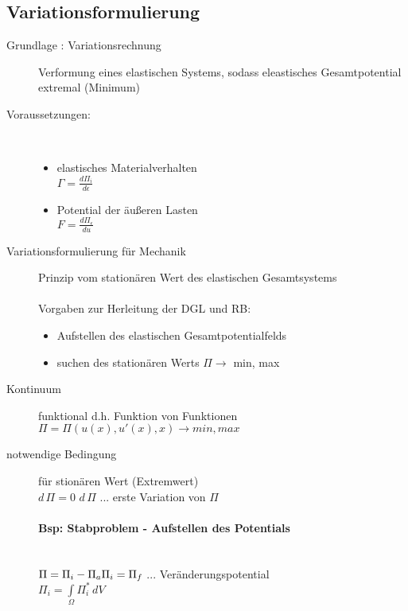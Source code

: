 \subsection{Variationsformulierung}
\begin{description}
	\item[Grundlage : Variationsrechnung] Verformung eines elastischen Systems, sodass eleastisches Gesamtpotential extremal (Minimum)
	
	\item[Voraussetzungen:]\hfill \\
		\begin{itemize}
			\item elastisches Materialverhalten\\
			\(\Gamma = \frac{d \Pi_i}{d \epsilon}\)
			\item Potential der äußeren Lasten \\
			\(F = \frac{d \Pi_\epsilon}{d u}\)
		\end{itemize}
	\item[Variationsformulierung für Mechanik] Prinzip vom stationären Wert des elastischen Gesamtsystems \\\\ Vorgaben zur Herleitung der DGL und RB:
		\begin{itemize}
			\item Aufstellen des elastischen Gesamtpotentialfelds
			\item suchen des stationären Werts $\Pi \rightarrow$ min, max
		\end{itemize}
	\item[Kontinuum] funktional d.h. Funktion von Funktionen\\
		\(\Pi = \Pi (u (x) , u' (x), x) \rightarrow min, max\)
		
	\item[notwendige Bedingung] für stionären Wert (Extremwert)\\
		\(d \,\Pi = 0\) \hspace{2cm} $d \,\Pi$ ... erste Variation von $\Pi$\\
		\paragraph{Bsp: Stabproblem - Aufstellen des Potentials}\hfill \\
		\(	\Pi = \Pi_i - \Pi_a\\
			\Pi_i = \Pi_f\) ... Veränderungspotential\\
		\(	\Pi_i = \int\limits_\Omega \Pi_i^* \, dV\)
\end{description}

